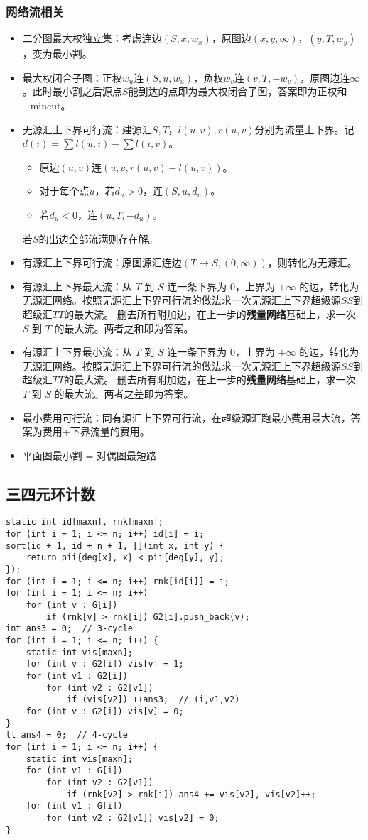 \documentclass[twoside]{article}
\begin{document}
\subsubsection{网络流相关}

\begin{itemize}
    \item 二分图最大权独立集：考虑连边$(S, x, w_x)$，原图边$(x,y,\infty)$，$(y,T,w_y)$，变为最小割。
    \item 最大权闭合子图：正权$w_u$连$(S,u,w_u)$，负权$w_v$连$(v,T,-w_v)$，原图边连$\infty$。此时最小割之后源点$S$能到达的点即为最大权闭合子图，答案即为正权和$-\text{mincut}$。
    \item 无源汇上下界可行流：建源汇$S,T$，$l(u,v),r(u,v)$分别为流量上下界。记$d(i) = \sum l(u,i) - \sum l(i,v)$。
    \begin{itemize}
        \item 原边$(u,v)$连$(u,v,r(u,v)-l(u,v))$。
        \item 对于每个点$u$，若$d_u>0$，连$(S, u, d_u)$。
        \item 若$d_u<0$，连$(u, T, -d_u)$。
    \end{itemize}
    若$S$的出边全部流满则存在解。
    \item 有源汇上下界可行流：原图源汇连边$(T\to S,(0,\infty))$，则转化为无源汇。
    \item 有源汇上下界最大流：从 $T$ 到 $S$ 连一条下界为 $0$，上界为 $+\infty$ 的边，转化为无源汇网络。按照无源汇上下界可行流的做法求一次无源汇上下界超级源$SS$到超级汇$TT$的最大流。
    删去所有附加边，在上一步的\textbf{残量网络}基础上，求一次 $S$ 到 $T$ 的最大流。两者之和即为答案。
    \item 有源汇上下界最小流：从 $T$ 到 $S$ 连一条下界为 $0$，上界为 $+\infty$ 的边，转化为无源汇网络。按照无源汇上下界可行流的做法求一次无源汇上下界超级源$SS$到超级汇$TT$的最大流。
    删去所有附加边，在上一步的\textbf{残量网络}基础上，求一次 $T$ 到 $S$ 的最大流。两者之差即为答案。
    \item 最小费用可行流：同有源汇上下界可行流，在超级源汇跑最小费用最大流，答案为费用+下界流量的费用。
    \item 平面图最小割 = 对偶图最短路
\end{itemize}
\subsection{三四元环计数}
\begin{lstlisting}
static int id[maxn], rnk[maxn];
for (int i = 1; i <= n; i++) id[i] = i;
sort(id + 1, id + n + 1, [](int x, int y) {
	return pii{deg[x], x} < pii{deg[y], y};
});
for (int i = 1; i <= n; i++) rnk[id[i]] = i;
for (int i = 1; i <= n; i++)
	for (int v : G[i])
		if (rnk[v] > rnk[i]) G2[i].push_back(v);
int ans3 = 0;  // 3-cycle
for (int i = 1; i <= n; i++) {
	static int vis[maxn];
	for (int v : G2[i]) vis[v] = 1;
	for (int v1 : G2[i])
		for (int v2 : G2[v1])
			if (vis[v2]) ++ans3;  // (i,v1,v2)
	for (int v : G2[i]) vis[v] = 0;
}
ll ans4 = 0;  // 4-cycle
for (int i = 1; i <= n; i++) {
	static int vis[maxn];
	for (int v1 : G[i])
		for (int v2 : G2[v1])
			if (rnk[v2] > rnk[i]) ans4 += vis[v2], vis[v2]++;
	for (int v1 : G[i])
		for (int v2 : G2[v1]) vis[v2] = 0;
}\end{lstlisting}
\end{document}
